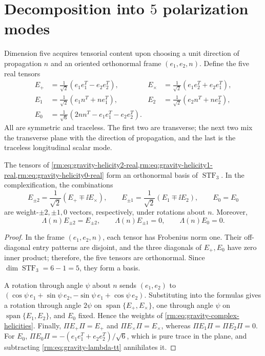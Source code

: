 \section{Decomposition into \(5\) polarization modes}

Dimension five acquires tensorial content upon choosing a unit direction
of propagation \(n\) and an oriented orthonormal frame
\((e_1,e_2,n)\). Define the five real tensors
\begin{align}
E_{+}&=\frac1{\sqrt2}(e_1e_1^T-e_2e_2^T),
&E_{\times}&=\frac1{\sqrt2}(e_1e_2^T+e_2e_1^T),
\label{rm:eq:gravity-helicity2-real}\\
E_{1}&=\frac1{\sqrt2}(e_1n^T+ne_1^T),
&E_{2}&=\frac1{\sqrt2}(e_2n^T+ne_2^T),
\label{rm:eq:gravity-helicity1-real}\\
E_{0}&=\frac1{\sqrt6}(2nn^T-e_1e_1^T-e_2e_2^T).
\label{rm:eq:gravity-helicity0-real}
\end{align}
All are symmetric and traceless. The first two are transverse; the
next two mix the transverse plane with the direction of
propagation, and the last is the traceless longitudinal scalar mode.

\begin{theorem}
\label{rm:thm:gravity-five-helicities}
The tensors of
\cref{rm:eq:gravity-helicity2-real,rm:eq:gravity-helicity1-real,rm:eq:gravity-helicity0-real}
form an orthonormal basis of \(\operatorname{STF}_3\). In the
complexification, the combinations
\begin{equation}
\label{rm:eq:gravity-complex-helicities}
E_{\pm2}=\frac1{\sqrt2}(E_+\mp\ii E_\times),
\qquad
E_{\pm1}=\frac1{\sqrt2}(E_1\mp\ii E_2),
\qquad E_0=E_0
\end{equation}
are weight-\(\pm2,\pm1,0\) vectors, respectively, under rotations
about \(n\). Moreover,
\begin{equation}
\label{rm:eq:gravity-tt-on-five}
\Lambda(n)E_{\pm2}=E_{\pm2},
\qquad
\Lambda(n)E_{\pm1}=0,
\qquad
\Lambda(n)E_0=0.
\end{equation}
\end{theorem}

\begin{proof}
In the frame \((e_1,e_2,n)\), each tensor has Frobenius norm one.
Their off-diagonal entry patterns are disjoint, and the three diagonals
of \(E_+,E_0\) have zero inner product; therefore, the five tensors
are orthonormal. Since \(\dim\operatorname{STF}_3=6-1=5\), they form a basis.

A rotation through angle \(\psi\) about \(n\) sends
\((e_1,e_2)\) to
\((\cos\psi\,e_1+\sin\psi\,e_2,
-\sin\psi\,e_1+\cos\psi\,e_2)\). Substituting into the formulas gives
a rotation through angle \(2\psi\) on
\(\operatorname{span}\{E_+,E_\times\}\), one through angle \(\psi\) on
\(\operatorname{span}\{E_1,E_2\}\), and \(E_0\) fixed. Hence the weights of
\cref{rm:eq:gravity-complex-helicities}. Finally,
\(\Pi E_{+}\Pi=E_+\) and \(\Pi E_\times\Pi=E_\times\), whereas
\(\Pi E_1\Pi=\Pi E_2\Pi=0\). For \(E_0\),
\(\Pi E_0\Pi=-(e_1e_1^T+e_2e_2^T)/\sqrt6\), which is pure trace in
the plane, and subtracting \cref{rm:eq:gravity-lambda-tt} annihilates it.
\end{proof}

